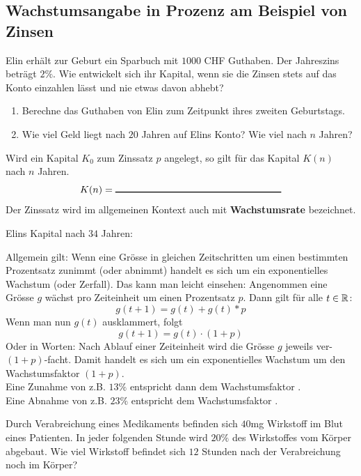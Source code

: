 \documentclass[11pt,oneside]{article}
\begin{document}
\subsection{Wachstumsangabe in Prozenz am Beispiel von Zinsen}
	\vspace{5pt}
	\begin{aufgabe}
		Elin erhält zur Geburt ein Sparbuch mit $1000$ CHF Guthaben. Der Jahreszins beträgt $2\%$. Wie entwickelt sich ihr Kapital, wenn sie die Zinsen stets auf das Konto einzahlen lässt und nie etwas davon abhebt?
		\begin{enumerate}[label=\alph*)]
			\item Berechne das Guthaben von Elin zum Zeitpunkt ihres zweiten Geburtstags.
			\item Wie viel Geld liegt nach $20$ Jahren auf Elins Konto? Wie viel nach $n$ Jahren?
		\end{enumerate}
	\end{aufgabe}
	\begin{satz}
		Wird ein Kapital $K_0$ zum Zinssatz $p$ angelegt, so gilt für das Kapital $K(n)$ nach $n$ Jahren.
		\[K(n)=\gap{6}\]
		Der Zinssatz wird im allgemeinen Kontext auch mit \textbf{Wachstumsrate} bezeichnet.
	\end{satz}
	\begin{beispiel}
		Elins Kapital nach $34$ Jahren:\vspace{5pt}\\
	\end{beispiel}
	Allgemein gilt: Wenn eine Grösse in gleichen Zeitschritten um einen bestimmten Prozentsatz zunimmt (oder abnimmt) handelt es sich um ein exponentielles Wachstum (oder Zerfall). Das kann man leicht einsehen: Angenommen eine Grösse $g$ wächst pro Zeiteinheit um einen Prozentsatz $p$. Dann gilt für alle $t\in\mathbb{R}$:
	\[g(t+1)=g(t)+g(t)*p\]
	Wenn man nun $g(t)$ ausklammert, folgt
	\[g(t+1)=g(t)\cdot (1+p)\]
	Oder in Worten: Nach Ablauf einer Zeiteinheit wird die Grösse $g$ jeweils ver-$(1+p)$-facht. Damit handelt es sich um ein exponentielles Wachstum um den Wachstumsfaktor $(1+p)$.\\
	Eine Zunahme von z.B. $13\%$ entspricht dann dem Wachstumsfaktor . \\
	Eine Abnahme von z.B. $23\%$ entspricht dem Wachstumsfaktor \gap{4}.
	\begin{beispiel}
		Durch Verabreichung eines Medikaments befinden sich $40$mg Wirkstoff im Blut eines Patienten. In jeder folgenden Stunde wird $20\%$ des Wirkstoffes vom Körper abgebaut. Wie viel Wirkstoff befindet sich $12$ Stunden nach der Verabreichung noch im Körper?\vspace{5pt}\\\karos{6}
	\end{beispiel}
\end{document}
